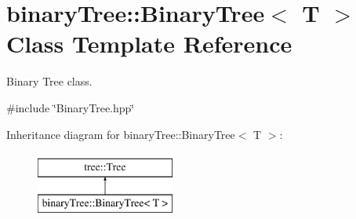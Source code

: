 \hypertarget{classbinaryTree_1_1BinaryTree}{\section{binary\-Tree\-:\-:Binary\-Tree$<$ T $>$ Class Template Reference}
\label{classbinaryTree_1_1BinaryTree}
}


Binary Tree class.  




{\ttfamily \#include \char`\"{}Binary\-Tree.\-hpp\char`\"{}}

Inheritance diagram for binary\-Tree\-:\-:Binary\-Tree$<$ T $>$\-:\begin{figure}[H]
\begin{center}
\leavevmode
\includegraphics[height=2.000000cm]{classbinaryTree_1_1BinaryTree}
\end{center}
\end{figure}

